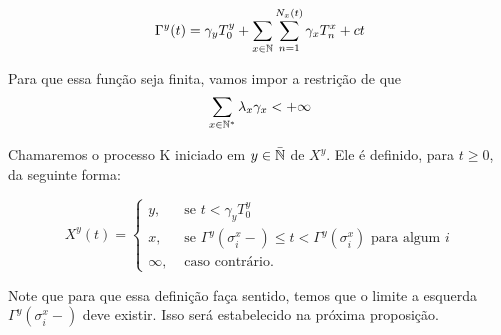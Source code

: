 \begin{equation}
  \label{def:Gamma}
  \Gamma^y (t) = \gamma_y T_0^y
  + \sum_{x \in {\mathbb{N}}} \sum_{n = 1}^{N_x(t)}
  \gamma_x T_n^x
  + ct
\end{equation}

Para que essa função seja \qc finita, vamos impor a restrição de que
\begin{equation}
  \sum_{x \in {\mathbb{N^*}}} \lambda_x\gamma_x < +\infty
\end{equation}

Chamaremos o processo K iniciado em $y \in {\bar{{\mathbb{N}}}}$ de $X^y$. Ele é
definido, para $t \geq 0$, da seguinte forma:

\begin{equation}
  \label{def:procK}
  X^y (t) =
  \begin{cases}
    y, & \textrm{ se }  t < \gamma_y T_0^y\\
    x, & \textrm{ se } \Gamma^y(\sigma_i^x-) \leq t <
    \Gamma^y(\sigma^x_i)
    \textrm{ para algum } i \\
    \infty, & \textrm{ caso contrário.}
  \end{cases}
\end{equation}

Note que para que essa definição faça sentido, temos que o limite a
esquerda $\Gamma^y (\sigma_i^x-)$ deve existir. Isso será estabelecido
na próxima proposição.

